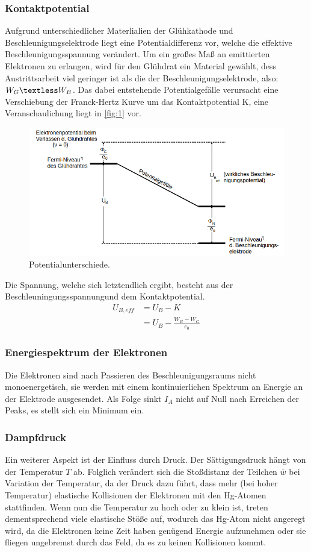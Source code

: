 \subsubsection{Kontaktpotential}
Aufgrund unterschiedlicher Materlialien der Glühkathode und Beschleunigungselektrode 
liegt eine Potentialdifferenz vor, welche die effektive Beschleunigungsspannung 
verändert. Um ein großes Maß an emittierten Elektronen zu erlangen, wird für 
den Glühdrat ein Material gewählt, dess Austrittsarbeit viel geringer ist als 
die der Beschleunigungselektrode, also: $W_G \textless W_B$. Das dabei 
entstehende Potentialgefälle verursacht eine Verschiebung der Franck-Hertz 
Kurve um das Kontaktpotential K, eine Veranschaulichung liegt in \autoref{fig:1}
vor.
\begin{figure}[H]
    \centering
        \centering
        \includegraphics[width=\textwidth]{Bilder/kp.png}
        \caption{Potentialunterschiede. \cite{anleitung5}}
    \hfill
    \label{fig:1}
\end{figure}
\noindent Die Spannung, welche sich letztendlich ergibt, besteht aus der
Beschleuningungsspannungund dem Kontaktpotential.
\begin{align}
    U_{B,eff} &= U_B - K \\
              &= U_B - \frac{W_B-W_G}{e_0}
\end{align}

\subsubsection{Energiespektrum der Elektronen}
Die Elektronen sind nach Passieren des Beschleunigungsraums nicht monoenergetisch,
sie werden mit einem kontinuierlichen Spektrum an Energie an der Elektrode 
ausgesendet. Als Folge sinkt $I_A$ nicht auf Null nach Erreichen der Peaks, 
es stellt sich ein Minimum ein.

\subsubsection{Dampfdruck}
Ein weiterer Aspekt ist der Einfluss durch Druck. Der Sättigungsdruck hängt von 
der Temperatur $T$ ab. Folglich verändert sich die Stoßdistanz der Teilchen 
$\overline{w}$ bei Variation der Temperatur, da der Druck dazu führt, dass 
mehr (bei hoher Temperatur) elastische Kollisionen der Elektronen mit den 
Hg-Atomen stattfinden. Wenn nun die Temperatur zu hoch oder zu klein ist, 
treten dementsprechend viele elastische Stöße auf, wodurch das Hg-Atom 
nicht angeregt wird, da die Elektronen keine Zeit haben genügend Energie 
aufzunehmen oder sie fliegen ungebremst durch das Feld, da es zu keinen 
Kollisionen kommt.